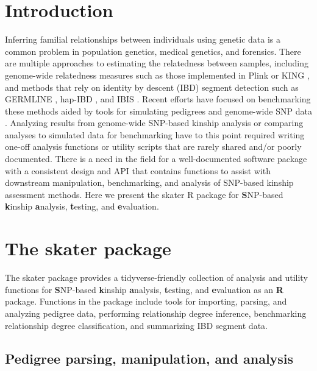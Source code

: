 \documentclass{bioinfo}
\begin{document}
\maketitle

\section{Introduction}

Inferring familial relationships between individuals using genetic data
is a common problem in population genetics, medical genetics, and
forensics. There are multiple approaches to estimating the relatedness
between samples, including genome-wide relatedness measures such as
those implemented in Plink \citep{purcell2007} or KING
\citep{manichaikul2010}, and methods that rely on identity by descent
(IBD) segment detection such as GERMLINE \citep{gusev2009}, hap-IBD
\citep{zhou2020}, and IBIS \citep{seidman2020}. Recent efforts have
focused on benchmarking these methods \citep{ramstetter2017, vries2021}
aided by tools for simulating pedigrees and genome-wide SNP data
\citep{caballero2019}. Analyzing results from genome-wide SNP-based
kinship analysis or comparing analyses to simulated data for
benchmarking have to this point required writing one-off analysis
functions or utility scripts that are rarely shared and/or poorly
documented. There is a need in the field for a well-documented software
package with a consistent design and API that contains functions to
assist with downstream manipulation, benchmarking, and analysis of
SNP-based kinship assessment methods. Here we present the skater R
package for \textbf{S}NP-based \textbf{k}inship \textbf{a}nalysis,
\textbf{t}esting, and \textbf{e}valuation.

\section{The skater package}

The skater package provides a tidyverse-friendly collection of analysis
and utility functions for \textbf{S}NP-based \textbf{k}inship
\textbf{a}nalysis, \textbf{t}esting, and \textbf{e}valuation as an
\textbf{R} package. Functions in the package include tools for
importing, parsing, and analyzing pedigree data, performing relationship
degree inference, benchmarking relationship degree classification, and
summarizing IBD segment data.

\subsection{Pedigree parsing, manipulation, and analysis}
\end{document}
